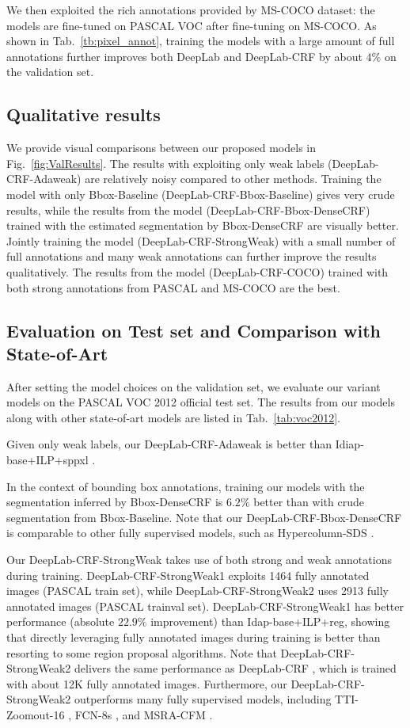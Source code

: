 We then exploited the rich annotations provided by MS-COCO
dataset: the models are fine-tuned on PASCAL VOC after fine-tuning on
MS-COCO. As shown in Tab.~\ref{tb:pixel_annot}, training the models
with a large amount of full annotations further improves both DeepLab
and DeepLab-CRF by about $4\%$ on the validation set.

\subsection{Qualitative results} 
\label{sec:test_qualitative}

We provide visual comparisons between our proposed models in
Fig.~\ref{fig:ValResults}. The results with exploiting only weak
labels (DeepLab-CRF-Adaweak) are relatively noisy compared to other
methods. Training the model with only Bbox-Baseline
(DeepLab-CRF-Bbox-Baseline) gives very crude results, while the
results from the model (DeepLab-CRF-Bbox-DenseCRF) trained with the
estimated segmentation by Bbox-DenseCRF are visually better. Jointly
training the model (DeepLab-CRF-StrongWeak) with a small number of
full annotations and many weak annotations can further improve the
results qualitatively. The results from the model (DeepLab-CRF-COCO)
trained with both strong annotations from PASCAL and MS-COCO are the
best.


\subsection{Evaluation on Test set and Comparison with State-of-Art}

After setting the model choices on the validation set, we evaluate our
variant models on the PASCAL VOC 2012 official test set. The results
from our models along with other state-of-art models are listed in
Tab.~\ref{tab:voc2012}. 

Given only weak labels, our DeepLab-CRF-Adaweak is better than Idiap-base+ILP+sppxl \citep{pinheiro2014weakly}. 

In the context of bounding box annotations, training our models with the segmentation inferred by Bbox-DenseCRF is $6.2\%$ better than with crude segmentation from Bbox-Baseline. Note that our DeepLab-CRF-Bbox-DenseCRF is comparable to other fully supervised models, such as Hypercolumn-SDS \citep{hariharan2014hypercolumns}.

Our DeepLab-CRF-StrongWeak takes use of both strong and weak annotations during training. DeepLab-CRF-StrongWeak1 exploits 1464 fully annotated images (PASCAL train set), while DeepLab-CRF-StrongWeak2 uses 2913 fully annotated images (PASCAL trainval set). DeepLab-CRF-StrongWeak1 has better performance (absolute $22.9\%$ improvement) than Idap-base+ILP+reg, showing that directly leveraging fully annotated images during training is better than resorting to some region proposal algorithms. Note that DeepLab-CRF-StrongWeak2 delivers the same performance as DeepLab-CRF \citep{chen2014semantic}, which is trained with about 12K fully annotated images. Furthermore, our DeepLab-CRF-StrongWeak2 outperforms many fully supervised models, including TTI-Zoomout-16 \citep{mostajabi2014feedforward}, FCN-8s \citep{long2014fully}, and MSRA-CFM \citep{dai2014convolutional}.

